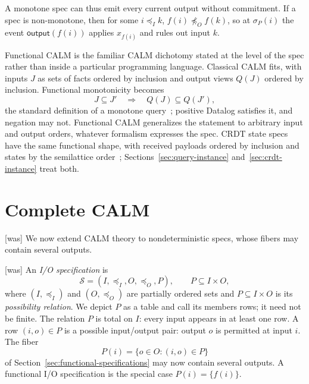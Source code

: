 \documentclass[sigconf]{cidr-2027}
\theoremstyle{remark}
\newcommand{\InputOrd}{\preceq_I}
\newcommand{\OutputOrd}{\preceq_O}
\newcommand{\commitment}{commitment\xspace}
\newcommand{\Spec}{\mathcal{S}}
\newcommand{\spectype}[1][]{I/O specification#1\xspace}
\newcommand{\fiber}[1]{P(#1)}
\begin{document}
\color{blue!70!black}A monotone spec can thus emit every current output without \commitment. If a
spec is non-monotone, then for some $i\InputOrd k$,
$f(i)\not\OutputOrd f(k)$, so at $\sigma_P(i)$ the event
$\mathsf{output}(f(i))$ applies $x_{f(i)}$ and rules out input $k$.\color{black}

Functional CALM is the familiar CALM dichotomy stated at the level of the spec
rather than inside a particular programming language.
Classical CALM fits, with inputs $J$ as sets of facts ordered by
inclusion and output views $Q(J)$ ordered by inclusion.  Functional
monotonicity becomes
        \begin{equation}
  J\subseteq J'
  \quad\Longrightarrow\quad
  Q(J)\subseteq Q(J'),
  \label{eq:query-monotonicity}
        \end{equation}
the standard definition of a monotone query~\cite{abiteboul1995foundations};
positive Datalog satisfies it, and negation may not.  Functional CALM
generalizes the statement to arbitrary input and
output orders, whatever formalism expresses the spec.  CRDT state specs have the same functional shape, with received payloads ordered by inclusion and states by the semilattice order~\cite{shapiro2011crdt}; Sections~\ref{sec:query-instance}
and~\ref{sec:crdt-instance} treat both.

\section{Complete CALM}
\label{sec:complete-calm}



{\footnotesize\color{black!50}\noindent\textsf{[was]} We now extend CALM theory to nondeterministic specs, whose fibers may contain
several outputs.\par}



{\footnotesize\color{black!50}\noindent\textsf{[was]} An \emph{\spectype} is
        \begin{equation}
  \Spec=(I,\InputOrd,O,\OutputOrd,P),
  \qquad P\subseteq I\times O,
        \end{equation}
  where $(I,\InputOrd)$ and $(O,\OutputOrd)$ are partially ordered sets and
  $P\subseteq I\times O$ is its \emph{possibility relation}.  We depict $P$ as
a table and call its members rows; it need not be finite.  The relation $P$
  is total on $I$: every input appears in at least one row.  A row $(i,o)\in P$
  is a possible input/output pair: output $o$ is permitted at input $i$.  The fiber
        \begin{equation}
  \fiber{i}=\{o\in O:(i,o)\in P\}
        \end{equation}
of Section~\ref{sec:functional-specifications} may now contain several
  outputs.  A functional \spectype is the special case $\fiber{i}=\{f(i)\}$.\par}
\end{document}
